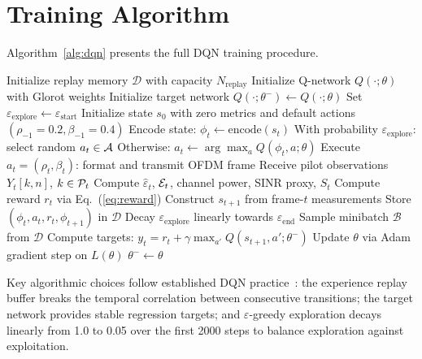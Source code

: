 \section{Training Algorithm}

Algorithm~\ref{alg:dqn} presents the full DQN training procedure.

\begin{algorithm}[!t]
\caption{DQN-Based Adaptive Pilot and Power Allocation}
\label{alg:dqn}
\begin{algorithmic}[1]
\State Initialize replay memory $\mathcal{D}$ with capacity $N_{\text{replay}}$
\State Initialize Q-network $Q(\cdot;\theta)$ with Glorot weights
\State Initialize target network $Q(\cdot;\theta^{-}) \leftarrow Q(\cdot;\theta)$
\State Set $\varepsilon_{\text{explore}} \leftarrow \varepsilon_{\text{start}}$
    \State Initialize state $s_0$ with zero metrics and default actions $(\rho_{-1}{=}0.2, \beta_{-1}{=}0.4)$
        \State Encode state: $\phi_t \leftarrow \text{encode}(s_t)$
        \State With probability $\varepsilon_{\text{explore}}$: select random $a_t \in \mathcal{A}$
        \State Otherwise: $a_t \leftarrow \arg\max_{a} Q(\phi_t, a; \theta)$
        \State Execute $a_t = (\rho_t, \beta_t)$: format and transmit OFDM frame
        \State Receive pilot observations $Y_t[k,n]$, $k \in \mathcal{P}_t$
        \State Compute $\hat{\varepsilon}_t$, $\mathcal{E}_t$, channel power, SINR proxy, $S_t$
        \State Compute reward $r_t$ via Eq.~(\ref{eq:reward})
        \State Construct $s_{t+1}$ from frame-$t$ measurements
        \State Store $(\phi_t, a_t, r_t, \phi_{t+1})$ in $\mathcal{D}$
        \State Decay $\varepsilon_{\text{explore}}$ linearly towards $\varepsilon_{\text{end}}$
            \State Sample minibatch $\mathcal{B}$ from $\mathcal{D}$
            \State Compute targets: $y_t = r_t + \gamma \max_{a'} Q(s_{t+1}, a'; \theta^{-})$
            \State Update $\theta$ via Adam gradient step on $L(\theta)$
        \EndIf
            \State $\theta^{-} \leftarrow \theta$
        \EndIf
    \EndFor
\EndFor
\end{algorithmic}
\end{algorithm}

Key algorithmic choices follow established DQN practice~\cite{mnih2015human}: the experience replay buffer breaks the temporal correlation between consecutive transitions; the target network provides stable regression targets; and $\varepsilon$-greedy exploration decays linearly from 1.0 to 0.05 over the first 2000 steps to balance exploration against exploitation.

